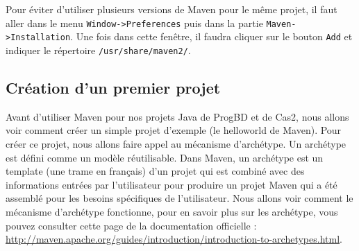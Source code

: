 \documentclass[a4paper,11pt]{article}
\begin{document}
Pour éviter d'utiliser plusieurs versions de Maven pour le même projet, il faut aller dans le menu \texttt{Window->Preferences} 
puis dans la partie \texttt{Maven->Installation}. Une fois dans cette fenêtre, il faudra cliquer sur le bouton \texttt{Add} 
et indiquer le répertoire \texttt{/usr/share/maven2/}.


\subsection{Création d'un premier projet}
Avant d'utiliser Maven pour nos projets Java de ProgBD et de Cas2, nous allons voir comment créer un simple projet 
d'exemple (le helloworld de Maven). Pour créer ce projet, nous allons faire appel au mécanisme d'archétype. Un archétype 
est défini comme un modèle réutilisable. Dans Maven, un archétype est un template (une trame en français) d'un projet 
qui est combiné avec des informations entrées par l'utilisateur pour produire un projet Maven qui a été assemblé pour 
les besoins spécifiques de l'utilisateur. Nous allons voir comment le mécanisme d'archétype fonctionne, pour en savoir 
plus sur les archétype, vous pouvez consulter cette page de la documentation officielle : 
\url{http://maven.apache.org/guides/introduction/introduction-to-archetypes.html}.
\end{document}
